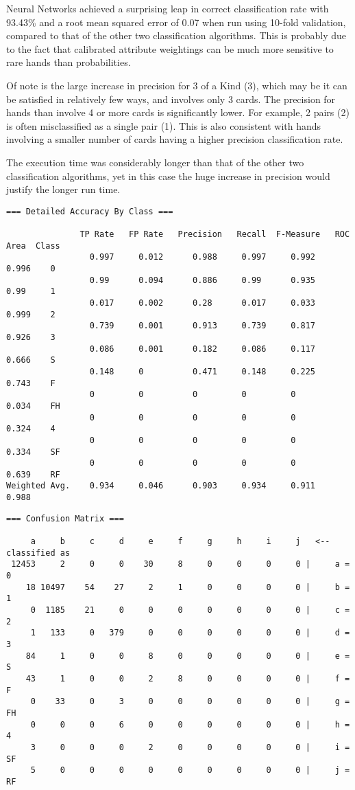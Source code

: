 \documentclass[11pt, a4paper]{article}
\begin{document}
Neural Networks achieved a surprising leap in correct classification rate with 93.43\% and a root mean squared error of 0.07 when run using 10-fold validation, compared to that of the other two classification algorithms. This is probably due to the fact that calibrated attribute weightings can be much more sensitive to rare hands than probabilities.

Of note is the large increase in precision for 3 of a Kind (3), which may be it can be satisfied in relatively few ways, and involves only 3 cards. The precision for hands than involve 4 or more cards is significantly lower. For example, 2 pairs (2) is often misclassified as a single pair (1). This is also consistent with hands involving a smaller number of cards having a higher precision classification rate. 

The execution time was considerably longer than that of the other two classification algorithms, yet in this case the huge increase in precision would justify the longer run time.
                 
\begin{verbatim}
=== Detailed Accuracy By Class ===

               TP Rate   FP Rate   Precision   Recall  F-Measure   ROC Area  Class
                 0.997     0.012      0.988     0.997     0.992      0.996    0
                 0.99      0.094      0.886     0.99      0.935      0.99     1
                 0.017     0.002      0.28      0.017     0.033      0.999    2
                 0.739     0.001      0.913     0.739     0.817      0.926    3
                 0.086     0.001      0.182     0.086     0.117      0.666    S
                 0.148     0          0.471     0.148     0.225      0.743    F
                 0         0          0         0         0          0.034    FH
                 0         0          0         0         0          0.324    4
                 0         0          0         0         0          0.334    SF
                 0         0          0         0         0          0.639    RF
Weighted Avg.    0.934     0.046      0.903     0.934     0.911      0.988
\end{verbatim}


\begin{verbatim}
=== Confusion Matrix ===

     a     b     c     d     e     f     g     h     i     j   <-- classified as
 12453     2     0     0    30     8     0     0     0     0 |     a = 0
    18 10497    54    27     2     1     0     0     0     0 |     b = 1
     0  1185    21     0     0     0     0     0     0     0 |     c = 2
     1   133     0   379     0     0     0     0     0     0 |     d = 3
    84     1     0     0     8     0     0     0     0     0 |     e = S
    43     1     0     0     2     8     0     0     0     0 |     f = F
     0    33     0     3     0     0     0     0     0     0 |     g = FH
     0     0     0     6     0     0     0     0     0     0 |     h = 4
     3     0     0     0     2     0     0     0     0     0 |     i = SF
     5     0     0     0     0     0     0     0     0     0 |     j = RF
\end{verbatim}
\end{document}
